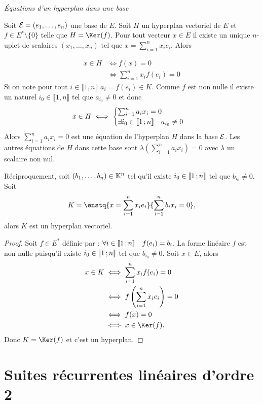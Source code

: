 \emph{Équations d'un hyperplan dans une base}

Soit $\mathcal{E}=(e_1, \ldots, e_n)$ une base de $E$. Soit $H$ un hyperplan vectoriel de $E$ et $f \in E^*\setminus\{0\}$ telle que $H=\Ker(f)$. Pour tout vecteur $x \in E$ il existe un unique $n$-uplet de scalaires $(x_1,\ldots, x_n)$ tel que $x = \sum_{i=1}^n x_i e_i$. Alors

\begin{align}
  x \in H &\iff f(x)=0\\
  &\iff \sum_{i=1}^n x_i f(e_i)=0
\end{align}
Si on note pour tout $i \in \llbracket 1,n \rrbracket$ $a_i=f(e_i) \in K$. Comme $f$ est non nulle il existe un naturel $i_0 \in \llbracket 1,n \rrbracket$ tel que $a_{i_0} \neq 0$ et donc
\begin{equation}
  x \in H \iff
  \begin{cases}
    \sum_{i=1}^n a_i x_i=0 \\ \exists i_0 \in \mathopen{\llbracket}1\mathclose{}\mathpunct{};n\mathclose{\rrbracket} \quad a_{i_0} \neq 0
  \end{cases}
\end{equation}
Alors $\sum_{i=1}^n a_i x_i=0$ est une équation de l'hyperplan $H$ dans la base $\mathcal{E}$. Les autres équations de $H$ dans cette base sont $\lambda \left(\sum_{i=1}^n a_i x_i\right)=0$ avec $\lambda$ un scalaire non nul.

Réciproquement, soit $(b_1, \ldots, b_n) \in \mathbb{K}^n$ tel qu'il existe $i_0 \in \mathopen{\llbracket}1\mathclose{}\mathpunct{};n\mathclose{\rrbracket}$ tel que $b_{i_0} \neq 0$. Soit
\begin{equation}
  K = \enstq{x = \sum_{i=1}^n x_i e_i}{\sum_{i=1}^n b_i x_i =0},
\end{equation}
alors $K$ est un hyperplan vectoriel.
\begin{proof}
  Soit $f \in E^*$ définie par : $\forall i \in \mathopen{\llbracket}1\mathclose{}\mathpunct{};n\mathclose{\rrbracket} \quad f(e_i)=b_i$. La forme linéaire $f$ est non nulle puisqu'il existe $i_0 \in \mathopen{\llbracket}1\mathclose{}\mathpunct{};n\mathclose{\rrbracket}$ tel que $b_{i_0} \neq 0$. Soit $x \in E$, alors
  \begin{align}
    x \in K &\iff \sum_{i=1}^n x_i f(e_i)=0 \\
    &\iff f\left(\sum_{i=1}^n x_i e_i \right) =0\\
    &\iff f(x)=0\\
    &\iff x \in \Ker(f).
  \end{align}
Donc $K=\Ker(f)$ et c'est un hyperplan.
\end{proof}

\section{Suites récurrentes linéaires d'ordre 2}

